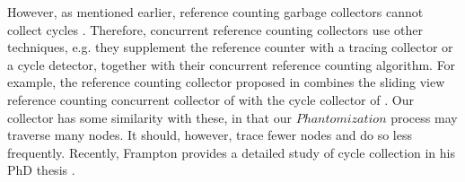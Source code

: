 However, as mentioned earlier, reference counting garbage collectors cannot collect cycles \cite{McBeth1963}. Therefore, concurrent reference counting collectors \cite{Barabash2005,Levanoni2006,Bacon2001,Bacon:2001:JWC,Paz2007,Lins2008} use other techniques, e.g. they supplement the reference counter with a tracing collector or a cycle detector, together with their concurrent reference counting algorithm. For example, the reference counting collector proposed in \cite{Paz2007} combines the sliding view reference counting concurrent collector of \cite{Levanoni2006} with the cycle collector of \cite{Bacon2001}. Our collector has some similarity with these, in that our $Phantomization$ process may traverse many nodes. It should, however, trace fewer nodes and do so less frequently. Recently, Frampton provides a detailed study of cycle collection in his PhD thesis \cite{Frampton2010}.



